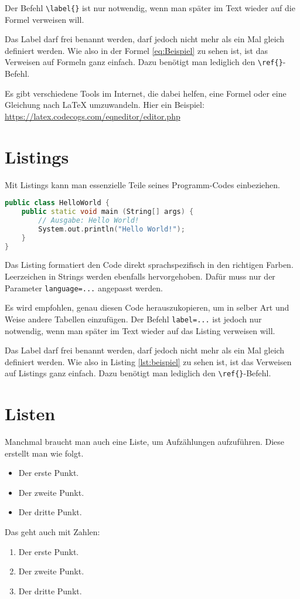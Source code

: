 Der Befehl \texttt{\textbackslash{}label\{\}} ist nur notwendig, wenn man später im Text wieder auf die Formel verweisen will.

Das Label darf frei benannt werden, darf jedoch nicht mehr als ein Mal gleich definiert werden. Wie also in der Formel \ref{eq:Beispiel} zu sehen ist, ist das Verweisen auf Formeln ganz einfach. Dazu benötigt man lediglich den \texttt{\textbackslash{}ref\{\}}-Befehl.

Es gibt verschiedene Tools im Internet, die dabei helfen, eine Formel oder eine Gleichung nach LaTeX umzuwandeln. Hier ein Beispiel: \href{https://latex.codecogs.com/eqneditor/editor.php}{https://latex.codecogs.com/eqneditor/editor.php}


\section{Listings}
Mit Listings kann man essenzielle Teile seines Programm-Codes einbeziehen.

\begin{lstlisting}[caption=Mein Beispiellisting, label=lst:beispiel, language=C++]
public class HelloWorld {
	public static void main (String[] args) {
		// Ausgabe: Hello World!
		System.out.println("Hello World!");
	}
}
\end{lstlisting}

Das Listing formatiert den Code direkt sprachspezifisch in den richtigen Farben. Leerzeichen in Strings werden ebenfalls hervorgehoben. Dafür muss nur der Parameter \texttt{language=...} angepasst werden.

Es wird empfohlen, genau diesen Code herauszukopieren, um in selber Art und Weise andere Tabellen einzufügen. Der Befehl \texttt{label=...} ist jedoch nur notwendig, wenn man später im Text wieder auf das Listing verweisen will.

Das Label darf frei benannt werden, darf jedoch nicht mehr als ein Mal gleich definiert werden. Wie also in Listing \ref{lst:beispiel} zu sehen ist, ist das Verweisen auf Listings ganz einfach. Dazu benötigt man lediglich den \texttt{\textbackslash{}ref\{\}}-Befehl.


\section{Listen}
Manchmal braucht man auch eine Liste, um Aufzählungen aufzuführen. Diese erstellt man wie folgt.

\begin{itemize}
\item Der erste Punkt.
\item Der zweite Punkt.
\item Der dritte Punkt.
\end{itemize}

Das geht auch mit Zahlen:

\begin{enumerate}
\item Der erste Punkt.
\item Der zweite Punkt.
\item Der dritte Punkt.
\end{enumerate}
